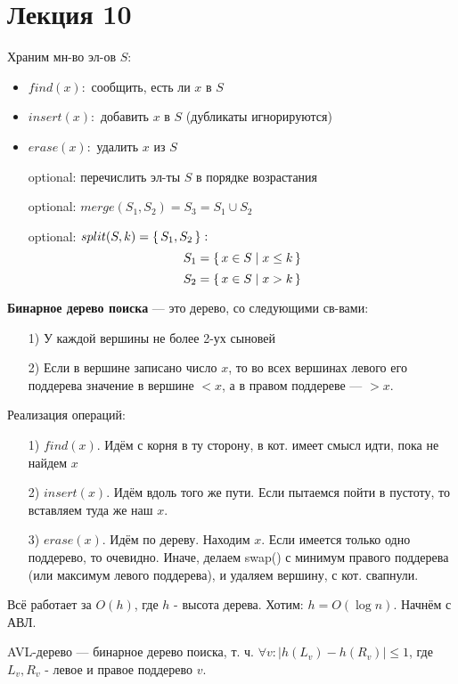 \section{Лекция 10}
Храним мн-во эл-ов $S$:
\begin{itemize}
  \item $find(x) \colon$ сообщить, есть ли $x$ в $S$
  \item $insert(x) \colon $ добавить $x$ в $S$ (дубликаты игнорируются)
  \item $erase(x) \colon$ удалить $x$ из $S$
  \item [optional: ] перечислить эл-ты $S$ в порядке возрастания
  \item [optional: ] $merge(S_1, S_2) = S_3 = S_1 \cup S_2$
  \item [optional: ] $split(S, k) = \set{S_1, S_2} \colon $
    \[
    S_1 = \set{x \in S | x \leq k}
    \]
    \[
    S_2 = \set{x \in S | x > k}
    \]
\end{itemize}
\begin{definition}
\textbf{Бинарное дерево поиска} --- это дерево, со следующими св-вами:
\begin{itemize}
  \item [1) ] У каждой вершины не более 2-ух сыновей
  \item [2) ] Если в вершине записано число $x$, то во всех вершинах левого его поддерева значение в вершине $< x$, а в правом поддереве --- $> x$.
\end{itemize}
\end{definition}
Реализация операций:
\begin{itemize}
  \item [1) ] $find(x)$. Идём с корня в ту сторону, в кот. имеет смысл идти, пока не найдем $x$
  \item [2) ] $insert(x)$. Идём вдоль того же пути. Если пытаемся пойти в пустоту, то вставляем туда же наш $x$.
  \item [3) ] $erase(x)$. Идём по дереву. Находим $x$. Если имеется только одно поддерево, то очевидно. Иначе, делаем swap() с минимум правого поддерева (или максимум левого поддерева), и удаляем вершину, с кот. свапнули.
\end{itemize}
Всё работает за $O(h)$, где $h$ - высота дерева. Хотим: $h = O(\log n)$. Начнём с АВЛ.
\begin{definition}
AVL-дерево --- бинарное дерево поиска, т. ч. $\forall v \colon \left|h(L_v) - h(R_v)\right| \leq 1$, где $L_v, R_v$ - левое и правое поддерево $v$.
\end{definition}

